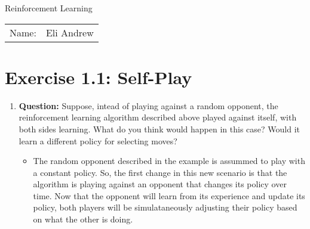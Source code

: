 \documentclass[12pt]{article}
\begin{document}
\begin{center}
{\Large Reinforcement Learning}

\begin{tabular}{rl}
Name: & Eli Andrew
\end{tabular}
\end{center}

\section*{Exercise 1.1: Self-Play}

\begin{enumerate}[label=(\alph*)]
  \item \textbf{Question:} Suppose, intead of playing against a random opponent, 
  the reinforcement learning algorithm described above played against itself, 
  with both sides learning. What do you think would happen in this case? 
  Would it learn a different policy for selecting moves?
  \begin{itemize}
    \item The random opponent described in the example is assummed to play with 
    a constant policy. So, the first change in this new scenario is that the 
    algorithm is playing against an opponent that changes its policy over time.
    Now that the opponent will learn from its experience and update its policy,
    both players will be simulataneously adjusting their policy based on what the 
    other is doing. 
  \end{itemize}

\end{enumerate}
\end{document}
